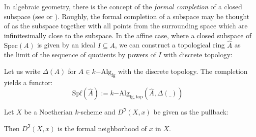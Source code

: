 \documentclass{msc}
\newcommand{\Spec}{\ensuremath{\mathrm{Spec}}}
\newcommand{\Spf}{\ensuremath{\mathrm{Spf}}}
\newcommand{\fgkAlg}{\ensuremath{k\mathrm{-Alg}_{\mathrm{fg}}}}
\newcommand{\fgkAlgTop}{\ensuremath{k\mathrm{-Alg}_{\mathrm{fg,top}}}}
\begin{document}
In algebraic geometry, there is the concept of the \emph{formal completion} of a closed subspace (see \cite[p.194]{hartshorne} or \cite[10.8]{ega}).
Roughly, the formal completion of a subspace may be thought of as the subspace together with
all points from the surrounding space which are infinitesimally close to the subspace.
In the affine case, where a closed subspace of $\Spec(A)$ is given by an ideal $I\subseteq A$, we can construct a topological ring $\hat{A}$
as the limit of the sequence of quotients by powers of $I$ with discrete topology:
\begin{center}
\end{center}
Let us write $\Delta(A)$ for $A\in\fgkAlg$ with the discrete topology.
The completion yields a functor:
\[ \Spf(\hat{A}) := \fgkAlgTop(\hat{A},\Delta(\_))\]
\begin{prp}
  Let $X$ be a Noetherian $k$-scheme and $D^\Im(X,x)$ be given as the pullback:
  \begin{center}
  \end{center}
  Then $D^\Im(X,x)$ is the formal neighborhood of $x$ in $X$. 
\end{prp}
\end{document}
